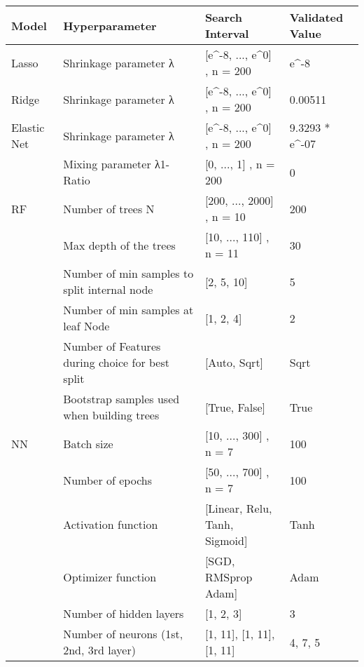 \begin{tabular}{llll}
\toprule
       Model &                                   Hyperparameter &                Search Interval & Validated Value \\
\midrule
       Lasso &                            Shrinkage parameter λ &     [e\textasciicircum -8, ..., e\textasciicircum 0] , n = 200 &            e\textasciicircum -8 \\
       Ridge &                            Shrinkage parameter λ &     [e\textasciicircum -8, ..., e\textasciicircum 0] , n = 200 &         0.00511 \\
 Elastic Net &                            Shrinkage parameter λ &     [e\textasciicircum -8, ..., e\textasciicircum 0] , n = 200 &  9.3293 * e\textasciicircum -07 \\
             &                        Mixing parameter λ1-Ratio &          [0, ..., 1] , n = 200 &               0 \\
          RF &                                Number of trees N &      [200, ..., 2000] , n = 10 &             200 \\
             &                           Max depth of the trees &        [10, ..., 110] , n = 11 &              30 \\
             &     Number of min samples to split internal node &                     [2, 5, 10] &               5 \\
             &               Number of min samples at leaf Node &                      [1, 2, 4] &               2 \\
             &  Number of Features during choice for best split &                   [Auto, Sqrt] &            Sqrt \\
             &       Bootstrap samples used when building trees &                  [True, False] &            True \\
          NN &                                       Batch size &         [10, ..., 300] , n = 7 &             100 \\
             &                                 Number of epochs &         [50, ..., 700] , n = 7 &             100 \\
             &                              Activation function &  [Linear, Relu, Tanh, Sigmoid] &            Tanh \\
             &                               Optimizer function &            [SGD, RMSprop Adam] &            Adam \\
             &                          Number of hidden layers &                      [1, 2, 3] &               3 \\
             &          Number of neurons (1st, 2nd, 3rd layer) &      [1, 11], [1, 11], [1, 11] &         4, 7, 5 \\
\bottomrule
\end{tabular}
